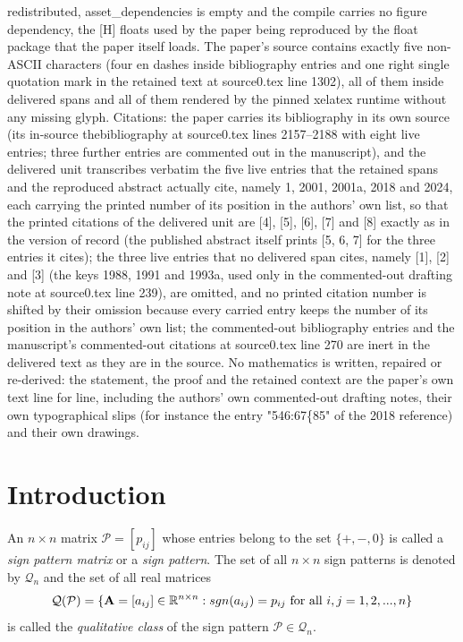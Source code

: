 \documentclass[10pt,a4paper]{amsart}
\numberwithin{equation}{section}
\def\sgn{{\rm sgn}}
\begin{document}
redistributed, asset\_dependencies is empty and the compile carries no figure dependency, the [H] floats used by the paper being reproduced by the float package that the paper itself loads. The paper's source contains exactly five non-ASCII characters (four en dashes inside bibliography entries and one right single quotation mark in the retained text at source0.tex line 1302), all of them inside delivered spans and all of them rendered by the pinned xelatex runtime without any missing glyph. Citations: the paper carries its bibliography in its own source (its in-source thebibliography at source0.tex lines 2157--2188 with eight live entries; three further entries are commented out in the manuscript), and the delivered unit transcribes verbatim the five live entries that the retained spans and the reproduced abstract actually cite, namely 1, 2001, 2001a, 2018 and 2024, each carrying the printed number of its position in the authors' own list, so that the printed citations of the delivered unit are [4], [5], [6], [7] and [8] exactly as in the version of record (the published abstract itself prints [5, 6, 7] for the three entries it cites); the three live entries that no delivered span cites, namely [1], [2] and [3] (the keys 1988, 1991 and 1993a, used only in the commented-out drafting note at source0.tex line 239), are omitted, and no printed citation number is shifted by their omission because every carried entry keeps the number of its position in the authors' own list; the commented-out bibliography entries and the manuscript's commented-out citations at source0.tex line 270 are inert in the delivered text as they are in the source. No mathematics is written, repaired or re-derived: the statement, the proof and the retained context are the paper's own text line for line, including the authors' own commented-out drafting notes, their own typographical slips (for instance the entry "546:67\{85" of the 2018 reference) and their own drawings.
	\section{Introduction}
	
	An $n\times n$ matrix $\mathcal{P}=[p_{ij}]$ whose entries belong to the set $\{+,-,0\}$ is called a \textit{sign pattern matrix} or a \textit{sign pattern}. The set of all $n\times n$ sign patterns is denoted by $\mathcal{Q}_n$ and the set of all real matrices $$\mathcal{Q}(\mathcal{P})=\{\mathbf{A}=[a_{ij}]\in\mathbb{R}^{n\times n}: \sgn(a_{ij})=p_{ij}~ \text{for} ~\text{all}~ i,j=1,2,...,n\}$$ is called the \textit{qualitative class} of the sign pattern $\mathcal{P}\in \mathcal{Q}_n$.
	
\end{document}
